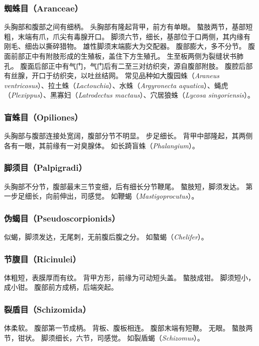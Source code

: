 \documentclass[11pt]{article}
\begin{document}
\subsubsection{蜘蛛目（Aranceae）}
头胸部和腹部之间有细柄。
头胸部有隆起背甲，前方有单眼。
螯肢两节，基部短粗，末端有爪，爪尖有毒腺开口。
脚须六节，细长，基部位于口两侧，其内缘有刚毛、细齿以撕碎猎物。
雄性脚须末端膨大为交配器。
腹部膨大，多不分节。
腹面前部正中有附肢形成的生殖板，盖住下方生殖孔。
生至板两侧为裂缝状书肺孔。
腹面后部正中有气门，气门后有二至三对纺织突，源自腹部附肢。
腹腔后部有丝腺，开口于纺织突，以吐丝结网。
常见品种如大腹园蛛（\textit{Araneus ventricosus}）、拉土蛛（\textit{Lactouchia}）、水蛛（\textit{Argyronecta aquatica}）、蝇虎（\textit{Plexippus}）、黑寡妇（\textit{Latrodectus mactaus}）、穴居狼蛛（\textit{Lycosa singoriensis}）。

\subsubsection{盲蛛目（Opiliones）}
头胸部与腹部连接处宽阔，腹部分节不明显。
步足细长。
背甲中部隆起，其两侧各有一眼，其前缘有一对臭腺体。
如长踦盲蛛（\textit{Phalangium}）。

\subsubsection{脚须目（Palpigradi）}
头胸部不分节，腹部最末三节变细，后有细长分节鞭尾。
螯肢短，脚须发达。
第一步足细长，向前伸出，司感觉。
如鞭蝎（\textit{Mastigoprocutus}）。

\subsubsection{伪蝎目（Pseudoscorpionids）}
似蝎，脚须发达，无尾刺，无前腹后腹之分。
如螯蝎（\textit{Chelifer}）。

\subsubsection{节腹目（Ricinulei）}
体粗短，表膜厚而有纹。
背甲方形，前缘为可动短头盖。
螯肢成钳。
脚须短小，成小钳。
腹部前方成柄，后端突起。

\subsubsection{裂盾目（Schizomida）}
体柔软。
腹部第一节成柄。
背板、腹板相连。
腹部末端有短鞭。
无眼。
螯肢两节，钳状。
脚须细长，六节，司感觉。
如裂盾蝎（\textit{Schizomus}）。
\end{document}
